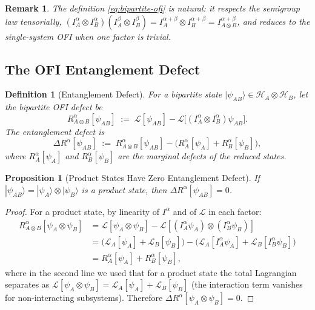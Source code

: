 \documentclass[12pt]{article}
\newtheorem{proposition}[theorem]{Proposition}
\newtheorem{definition}[theorem]{Definition}
\newtheorem{remark}[theorem]{Remark}
\theoremstyle{definition}
\begin{document}
\begin{remark}
The definition \eqref{eq:bipartite-ofi} is natural: it respects the
semigroup law tensorially,
$(I^\alpha_A \otimes I^\alpha_B)(I^\beta_A \otimes I^\beta_B)
= I^{\alpha+\beta}_A \otimes I^{\alpha+\beta}_B
= I^{\alpha+\beta}_{A\otimes B}$,
and reduces to the single-system OFI when one factor is trivial.
\end{remark}

\subsection{The OFI Entanglement Defect}

\begin{definition}[Entanglement Defect]
\label{def:ent-defect}
For a bipartite state $|\psi_{AB}\rangle \in \mathcal{H}_A\otimes\mathcal{H}_B$,
let the bipartite OFI defect be
\begin{equation}
  R^\alpha_{A\otimes B}[\psi_{AB}]
  \;:=\;
  \mathcal{L}[\psi_{AB}]
  - \mathcal{L}\bigl[(I^\alpha_A\otimes I^\alpha_B)\psi_{AB}\bigr].
  \label{eq:bipartite-defect}
\end{equation}
The \emph{entanglement defect} is
\begin{equation}
  \Delta R^\alpha[\psi_{AB}]
  \;:=\;
  R^\alpha_{A\otimes B}[\psi_{AB}]
  -\bigl(R^\alpha_A[\psi_A] + R^\alpha_B[\psi_B]\bigr),
  \label{eq:ent-defect}
\end{equation}
where $R^\alpha_A[\psi_A]$ and $R^\alpha_B[\psi_B]$ are the marginal
defects of the reduced states.
\end{definition}

\begin{proposition}[Product States Have Zero Entanglement Defect]
\label{prop:product}
If $|\psi_{AB}\rangle = |\psi_A\rangle \otimes |\psi_B\rangle$ is a
product state, then $\Delta R^\alpha[\psi_{AB}] = 0$.
\end{proposition}

\begin{proof}
For a product state, by linearity of $I^\alpha$ and of $\mathcal{L}$ in
each factor:
\begin{align}
  R^\alpha_{A\otimes B}[\psi_A\otimes\psi_B]
  &= \mathcal{L}[\psi_A\otimes\psi_B]
     - \mathcal{L}[(I^\alpha_A\psi_A)\otimes(I^\alpha_B\psi_B)] \nonumber\\
  &= \bigl(\mathcal{L}_A[\psi_A] + \mathcal{L}_B[\psi_B]\bigr)
     - \bigl(\mathcal{L}_A[I^\alpha_A\psi_A]
             + \mathcal{L}_B[I^\alpha_B\psi_B]\bigr) \nonumber\\
  &= R^\alpha_A[\psi_A] + R^\alpha_B[\psi_B],
\end{align}
where in the second line we used that for a product state the total
Lagrangian separates as $\mathcal{L}[\psi_A\otimes\psi_B]
= \mathcal{L}_A[\psi_A] + \mathcal{L}_B[\psi_B]$ (the interaction
term vanishes for non-interacting subsystems).  Therefore
$\Delta R^\alpha[\psi_A\otimes\psi_B] = 0$.
\end{proof}
\end{document}
